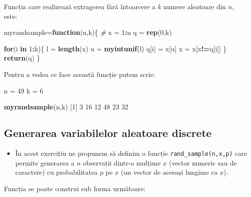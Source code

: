 \documentclass[]{article}
\newenvironment{Shaded}{\begin{snugshade}}{\end{snugshade}}
\newcommand{\KeywordTok}[1]{\textcolor[rgb]{0.13,0.29,0.53}{\textbf{#1}}}
\newcommand{\DecValTok}[1]{\textcolor[rgb]{0.00,0.00,0.81}{#1}}
\newcommand{\StringTok}[1]{\textcolor[rgb]{0.31,0.60,0.02}{#1}}
\newcommand{\CommentTok}[1]{\textcolor[rgb]{0.56,0.35,0.01}{\textit{#1}}}
\newcommand{\ControlFlowTok}[1]{\textcolor[rgb]{0.13,0.29,0.53}{\textbf{#1}}}
\newcommand{\OperatorTok}[1]{\textcolor[rgb]{0.81,0.36,0.00}{\textbf{#1}}}
\newcommand{\NormalTok}[1]{#1}
\newenvironment{frshaded*}{%
  \def\FrameCommand{\fboxrule=\FrameRule\fboxsep=\FrameSep \fcolorbox{framecolor}{shadecolor1}}%
  \MakeFramed {\advance\hsize-\width \FrameRestore}}%
{\endMakeFramed}
\newenvironment{rmdblock}[1]
  {\begin{frshaded*}
  \begin{itemize}
  \renewcommand{\labelitemi}{
    \raisebox{-.7\height}[0pt][0pt]{
      {\setkeys{Gin}{width=2em,keepaspectratio}\texttt{[image: images/icons/\#1]}}
    }
  }
  \item
  }
  {
  \end{itemize}
  \end{frshaded*}
  }
\newenvironment{rmdexercise}
  {\begin{rmdblock}{exercise}}
  {\end{rmdblock}}
\begin{document}
Funcția care realizează extragerea fără întoarcere a \(k\) numere
aleatoare din \(n\), este:

\begin{Shaded}
\begin{Highlighting}[]
\NormalTok{myrandsample=}\ControlFlowTok{function}\NormalTok{(n,k)\{}
  \CommentTok{# }
\NormalTok{  x =}\StringTok{ }\DecValTok{1}\OperatorTok{:}\NormalTok{n}
\NormalTok{  q =}\StringTok{ }\KeywordTok{rep}\NormalTok{(}\DecValTok{0}\NormalTok{,k)}
  
  \ControlFlowTok{for}\NormalTok{(i }\ControlFlowTok{in} \DecValTok{1}\OperatorTok{:}\NormalTok{k)\{}
\NormalTok{    l =}\StringTok{ }\KeywordTok{length}\NormalTok{(x)}
\NormalTok{    u =}\StringTok{ }\KeywordTok{myintunif}\NormalTok{(l)}
\NormalTok{    q[i] =}\StringTok{ }\NormalTok{x[u]}
\NormalTok{    x =}\StringTok{ }\NormalTok{x[x}\OperatorTok{!=}\NormalTok{q[i]]}
\NormalTok{  \}}
  \KeywordTok{return}\NormalTok{(q)}
\NormalTok{\}}
\end{Highlighting}
\end{Shaded}

Pentru a vedea ce face această funcție putem scrie:

\begin{Shaded}
\begin{Highlighting}[]
\NormalTok{n =}\StringTok{ }\DecValTok{49}
\NormalTok{k =}\StringTok{ }\DecValTok{6}

\KeywordTok{myrandsample}\NormalTok{(n,k)}
\NormalTok{[}\DecValTok{1}\NormalTok{]  }\DecValTok{3} \DecValTok{16} \DecValTok{12} \DecValTok{48} \DecValTok{23} \DecValTok{32}
\end{Highlighting}
\end{Shaded}

\subsection{Generarea variabilelor aleatoare
discrete}\label{generarea-variabilelor-aleatoare-discrete}

\begin{rmdexercise}
În acest exercițiu ne propunem să definim o funcție
\texttt{rand\_sample(n,x,p)} care permite generarea a \(n\) observații
dintr-o mulțime \(x\) (vector numeric sau de caractere) cu
probabilitatea \(p\) pe \(x\) (un vector de aceeași lungime ca \(x\)).
\end{rmdexercise}

Funcția se poate construi sub forma următoare:
\end{document}
